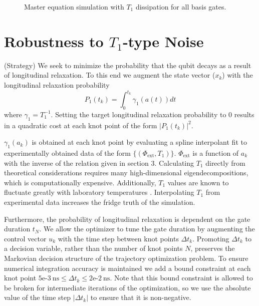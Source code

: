 \documentclass[
  amsfonts,
  amsmath,
  tbtags,
  amssymb,
  aps,
  nobibnotes,
  twocolumn,
]{revtex4-2}
\begin{document}
\begin{figure}[!t]
\begin{subfigure}{.3\linewidth}
    \label{fig:sub-third}
  \end{subfigure}
  \caption{Master equation simulation with $T_{1}$ dissipation for all basis gates.}
  \label{fig:fig}
\end{figure}


\section{Robustness to $T_{1}$-type Noise}
(Strategy) We seek to minimize the probability
that the qubit decays as a result of longitudinal
relaxation. To this end we augment the state vector ($x_{k}$) with the
longitudinal relaxation probability
\begin{equation}
  P_{1}(t_{k}) = \int_{0}^{t_{k}} \gamma_{1}(a(t)) dt
\end{equation}
where $\gamma_{1} = T_{1}^{-1}$. Setting the target
longitudinal relaxation probability to 0 results in
a quadratic cost at each knot point
of the form ${\lvert P_{1}(t_{k}) \rvert}^{2}$.

$\gamma_{1}(a_{k})$
is obtained at each knot point by evaluating
a spline interpolant fit to
experimentally obtained data of the form
$\{(\Phi_{\textrm{ext}}, T_{1})\}$.
$\Phi_{\textrm{ext}}$ is a function of $a_{k}$
with the inverse of the relation given in section 3.
Calculating $T_{1}$ directly from theoretical
considerations requires many high-dimensional
eigendecompositions, which
is computationally expensive. Additionally,
$T_{1}$ values are known to fluctuate greatly
with laboratory temperatures \cite{klimov2018fluctuations}.
Interpolating $T_{1}$ from experimental data increases
the fridge truth of the simulation.

Furthermore, the probability of longitudinal 
relaxation is dependent on the gate duration $t_{N}$.
We allow the optimizer to tune the gate duration by
augmenting the control vector $u_{k}$ with
the time step between knot points $\Delta t_{k}$.
Promoting $\Delta t_{k}$ to a decision variable, rather
than the number of knot points $N$, preserves the
Markovian decision structure of the trajectory
optimization problem. To ensure numerical
integration accuracy is maintained we add a bound
constraint at each knot point
$5\textrm{e-}3 \ \textrm{ns} \le
\Delta t_{k} \le 2\textrm{e-}2 \ \textrm{ns}$.
Note that this bound constraint is allowed to be
broken for intermediate iterations of the optimization,
so we use the absolute value of the time step
$\lvert \Delta t_{k} \rvert$ to ensure that it is non-negative.
\end{document}
